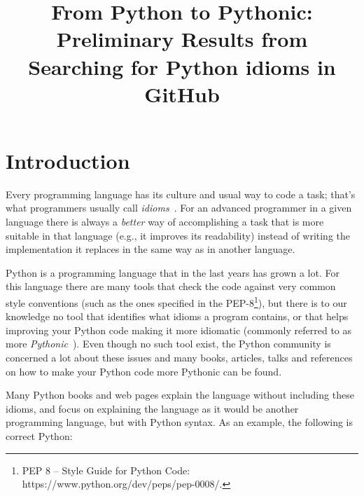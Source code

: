 \documentclass[conference]{IEEEtran}
\begin{document}
\title{From Python to Pythonic:\\ Preliminary Results from Searching for Python idioms in GitHub}


\author{
\and
{}
}


\maketitle
\IEEEpeerreviewmaketitle

\section{Introduction}

Every programming language has its culture and usual way to code a task; that's what programmers usually call \emph{idioms}~\cite{coplien1997advanced}. For an advanced programmer in a given language there is always a \emph{better} way of accomplishing a task that is more suitable in that language (e.g., it improves its readability) instead of writing the implementation it replaces in the same way as in another language.

Python is a programming language that in the last years has grown a lot. For this language there are many tools that check the code against very common style conventions (such as the ones specified in the PEP-8\footnote{PEP 8 -- Style Guide for Python Code: https://www.python.org/dev/peps/pep-0008/.}), but there is to our knowledge no tool that identifies what idioms a program contains, or that helps improving your Python code making it more idiomatic (commonly referred to as more \emph{Pythonic}~\cite{van2007python}). Even though no such tool exist, the Python community is concerned a lot about these issues and many books, articles, talks and references on how to make your Python code more Pythonic can be found.

Many Python books and web pages explain the language without including these idioms, and focus on explaining the language as it would be another programming language, but with Python syntax. As an example, the following is correct Python:
\end{document}
